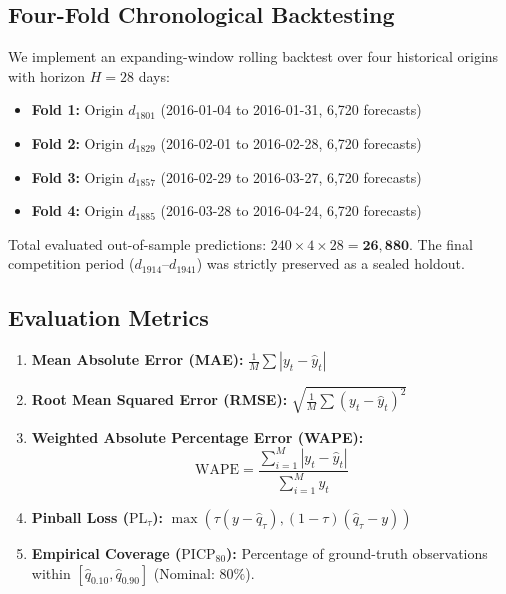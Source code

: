 \documentclass[conference]{IEEEtran}
\begin{document}
\subsection{Four-Fold Chronological Backtesting}
We implement an expanding-window rolling backtest over four historical origins with horizon $H=28$ days:
\begin{itemize}
    \item \textbf{Fold 1:} Origin $d_{1801}$ (2016-01-04 to 2016-01-31, 6,720 forecasts)
    \item \textbf{Fold 2:} Origin $d_{1829}$ (2016-02-01 to 2016-02-28, 6,720 forecasts)
    \item \textbf{Fold 3:} Origin $d_{1857}$ (2016-02-29 to 2016-03-27, 6,720 forecasts)
    \item \textbf{Fold 4:} Origin $d_{1885}$ (2016-03-28 to 2016-04-24, 6,720 forecasts)
\end{itemize}
Total evaluated out-of-sample predictions: $240 \times 4 \times 28 = \mathbf{26,880}$. The final competition period ($d_{1914}\text{--}d_{1941}$) was strictly preserved as a sealed holdout.

\subsection{Evaluation Metrics}
\begin{enumerate}
    \item \textbf{Mean Absolute Error (MAE):} $\frac{1}{M}\sum |y_t - \hat{y}_t|$
    \item \textbf{Root Mean Squared Error (RMSE):} $\sqrt{\frac{1}{M}\sum (y_t - \hat{y}_t)^2}$
    \item \textbf{Weighted Absolute Percentage Error (WAPE):}
    \begin{equation}
    \text{WAPE} = \frac{\sum_{i=1}^M |y_t - \hat{y}_t|}{\sum_{i=1}^M y_t}
    \end{equation}
    \item \textbf{Pinball Loss ($\text{PL}_\tau$):} $\max(\tau(y - \hat{q}_\tau), (1-\tau)(\hat{q}_\tau - y))$
    \item \textbf{Empirical Coverage ($\text{PICP}_{80}$):} Percentage of ground-truth observations within $[\hat{q}_{0.10}, \hat{q}_{0.90}]$ (Nominal: $80\%$).
\end{enumerate}

\end{document}
